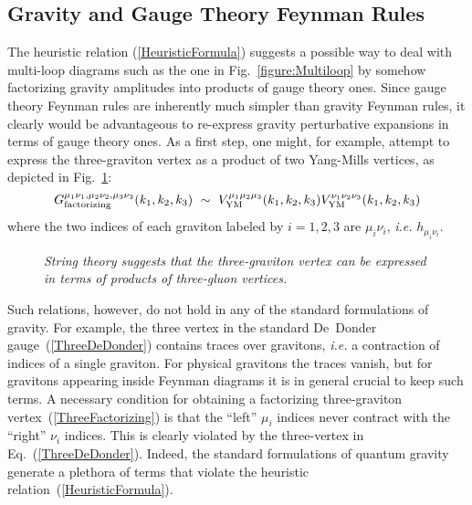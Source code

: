 \subsection{Gravity and Gauge Theory Feynman Rules}

The heuristic relation (\ref{HeuristicFormula}) suggests a possible
way to deal with multi-loop diagrams such as the one in
Fig.~\ref{figure:Multiloop} by somehow factorizing gravity amplitudes
into products of gauge theory ones.  Since gauge theory Feynman rules
are inherently much simpler than gravity Feynman rules, it clearly
would be advantageous to re-express gravity perturbative expansions in
terms of gauge theory ones.  As a first step, one might, for example,
attempt to express the three-graviton vertex as a product of two
Yang-Mills vertices, as depicted in Fig.~\ref{figure:ThreeVertex}:
%
\begin{equation}
G_{\rm factorizing}^{\mu_1 \nu_1,\mu_2\nu_2,\mu_3\nu_3}(k_1,k_2,k_3)\ \sim\
V_{\rm YM}^{\mu_1 \mu_2 \mu_3}(k_1,k_2,k_3)
V_{\rm YM}^{\nu_1 \nu_2 \nu_3}(k_1,k_2,k_3)
\label{ThreeFactorizing}
\end{equation}
%
where the two indices of each graviton labeled by $i=1,2,3$ are 
$\mu_i \nu_i$, {\it i.e.} $h_{\mu_i \nu_i}$. 


\begin{figure}[h]
  \def\epsfsize#1#2{0.4#1}
  \centerline{}
  \caption{\it String theory suggests that the three-graviton vertex can
be expressed in terms of products of three-gluon vertices.}
  \label{figure:ThreeVertex}
\end{figure}

Such relations, however, do not hold in any of the standard formulations
of gravity.  For example, the three vertex in the standard De~Donder
gauge~(\ref{ThreeDeDonder}) contains traces over gravitons, {\it i.e.} a
contraction of indices of a single graviton.  For physical gravitons
the traces vanish, but for gravitons appearing inside Feynman diagrams
it is in general crucial to keep such terms.  A necessary condition
for obtaining a factorizing three-graviton
vertex~(\ref{ThreeFactorizing}) is that the ``left'' $\mu_i$ indices
never contract with the ``right'' $\nu_i$ indices.  This is clearly
violated by the three-vertex in Eq.~(\ref{ThreeDeDonder}).  Indeed,
the standard formulations of quantum gravity generate a plethora of
terms that violate the heuristic relation~(\ref{HeuristicFormula}).


